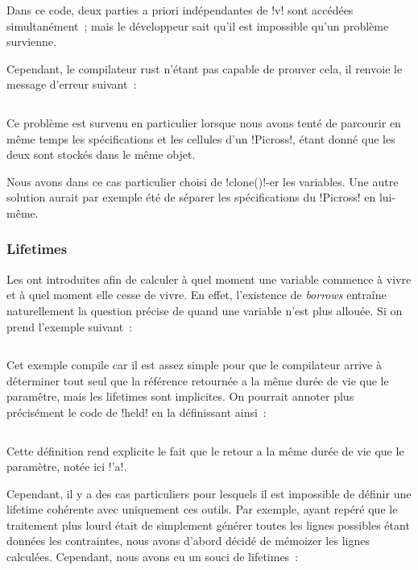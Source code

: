 {\inputminted{rust}{BorrowChecker.rs}

Dans ce code, deux parties a priori indépendantes de \inl!v! sont accédées
simultanément~; mais le développeur sait qu'il est impossible qu'un problème
survienne.

Cependant, le compilateur rust n'étant pas capable de prouver cela, il renvoie
le message d'erreur suivant~:

\inputminted[breaklines]{rust}{BorrowChecker.log}

Ce problème est survenu en particulier lorsque nous avons tenté de parcourir en
même temps les spécifications et les cellules d'un \inl!Picross!, étant donné
que les deux sont stockés dans le même objet.

Nous avons dans ce cas particulier choisi de \inl!clone()!-er les variables. Une
autre solution aurait par exemple été de séparer les spécifications du
\inl!Picross! en lui-même.

\subsubsection{Lifetimes}

Les \lifetimes ont introduites afin de calculer à quel moment une variable
commence à vivre et à quel moment elle cesse de vivre. En effet, l'existence de
\emph{borrows} entraîne naturellement la question précise de quand une variable
n'est plus allouée. Si on prend l'exemple suivant~:

\inputminted{rust}{LifeTimeWorking.rs}

Cet exemple compile car il est assez simple pour que le compilateur arrive à
déterminer tout seul que la référence retournée a la même durée de vie que le
paramêtre, mais les lifetimes sont implicites. On pourrait annoter plus
précisément le code de \inl!held! en la définissant ainsi~:

\inputminted{rust}{LifeTimeAnnotated.rs}

Cette définition rend explicite le fait que le retour a la même durée de vie que
le paramètre, notée ici \inl!'a!.

Cependant, il y a des cas particuliers pour lesquels il est impossible de
définir une lifetime cohérente avec uniquement ces outils. Par exemple, ayant
repéré que le traitement plus lourd était de simplement générer toutes les
lignes possibles étant données les contraintes, nous avons d'abord décidé de
mémoizer les lignes calculées. Cependant, nous avons eu un souci de lifetimes~:

}
